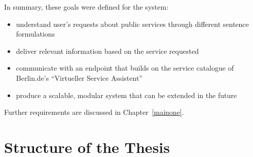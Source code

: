 In summary, these goals were defined for the system:

\begin{itemize}
	\item understand user's requests about public services through different sentence formulations
	\item deliver relevant information based on the service requested
	\item communicate with an endpoint that builds on the service catalogue of Berlin.de's ``Virtueller Service Assistent''
	\item produce a scalable, modular system that can be extended in the future
\end{itemize}

Further requirements are discussed in Chapter~\ref{mainone}.






















\section{Structure of the Thesis}
%

